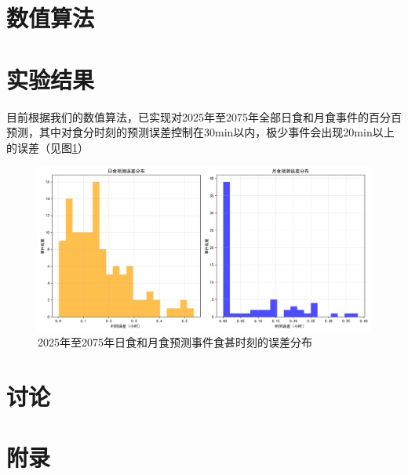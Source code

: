 \documentclass[hidelinks]{article}
\begin{document}
\section{数值算法}

\section{实验结果}
目前根据我们的数值算法，已实现对2025年至2075年全部日食和月食事件的百分百预测，其中对食分时刻的预测误差控制在30min以内，极少事件会出现20min以上的误差（见图\ref{fig:eclipse_error}）

\begin{figure}[h]
    \centering
    \includegraphics[width=0.5\linewidth]{images/error_distribution.png}
    \caption{2025年至2075年日食和月食预测事件食甚时刻的误差分布}
    \label{fig:eclipse_error}
\end{figure}
\section{讨论}

\section{附录}
\end{document}
